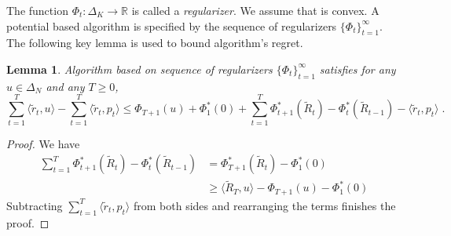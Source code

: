 \documentclass{article}
\newtheorem{lemma}{Lemma}
\newcommand{\R}{\mathbb{R}}
\begin{document}
The function $\Phi_t:\Delta_K \to \R$ is called a \emph{regularizer}. We assume
that is convex. A potential based algorithm is specified by the sequence
of regularizers $\{\Phi_t\}_{t=1}^\infty$. The following key lemma is used to bound
algorithm's regret.

\begin{lemma}
Algorithm based on sequence of regularizers $\{\Phi_t\}_{t=1}^\infty$ satisfies
for any $u \in \Delta_N$ and any $T \ge 0$,
$$
\sum_{t=1}^T \langle \widetilde r_t, u \rangle - \sum_{t=1}^T \langle \widetilde r_t, p_t \rangle
\le \Phi_{T+1}(u) + \Phi_1^*(0) + \sum_{t=1}^T \Phi_{t+1}^*(\widetilde R_t) - \Phi_t^*(\widetilde R_{t-1}) - \langle \widetilde r_t, p_t \rangle \; .
$$
\end{lemma}

\begin{proof}
We have
\begin{align*}
\sum_{t=1}^T \Phi_{t+1}^*(\widetilde R_t) - \Phi_t^*(\widetilde R_{t-1})
& = \Phi_{T+1}^*(\widetilde R_t) - \Phi_1^*(0) \\
& \ge \langle \widetilde R_T, u \rangle -  \Phi_{T+1}(u) - \Phi_1^*(0)
\end{align*}
Subtracting $\sum_{t=1}^T \langle \widetilde r_t, p_t \rangle$ from both sides
and rearranging the terms finishes the proof.
\end{proof}
\end{document}
